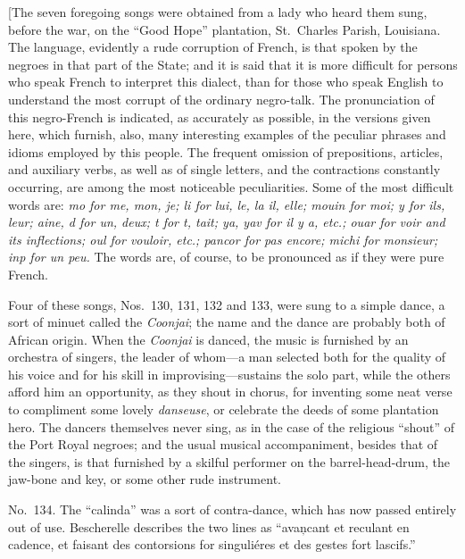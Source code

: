 \documentclass[a5paper,10pt]{book}
\begin{document}
\begin{extra}
  [The seven foregoing songs were obtained from a lady who heard them
    sung, before the war, on the ``Good Hope'' plantation, St.~Charles
    Parish, Louisiana.  The language, evidently a rude corruption of
    French, is that spoken by the negroes in that part of the State;
    and it is said that it is more difficult for persons who speak
    French to interpret this dialect, than for those who speak English
    to understand the most corrupt of the ordinary negro-talk.  The
    pronunciation of this negro-French is indicated, as accurately as
    possible, in the versions given here, which furnish, also, many
    interesting examples of the peculiar phrases and idioms employed
    by this people.  The frequent omission of prepositions, articles,
    and auxiliary verbs, as well as of single letters, and the
    contractions constantly occurring, are among the most noticeable
    peculiarities.  Some of the most difficult words are: \emph{mo
      \emph{for} me, mon, je; li \emph{for} lui, le, la il, elle;
      mouin \emph{for} moi; y \emph{for} ils, leur; aine, d \emph{for}
      un, deux; t \emph{for} t, tait; ya, yav \emph{for} il y a,
      \emph{etc.;} ouar \emph{for} voir \emph{and its inflections;}
      oul \emph{for} vouloir, \emph{etc.;} pancor \emph{for} pas
      encore; michi \emph{for} monsieur; inp \emph{for} un peu.}  The
    words are, of course, to be pronounced as if they were pure
    French.

    Four of these songs, Nos.~130, 131, 132 and 133, were sung to a
    simple dance, a sort of minuet called the \emph{Coonjai}; the name
    and the dance are probably both of African origin.  When the
    \emph{Coonjai} is danced, the music is furnished by an orchestra
    of singers, the leader of whom---a man selected both for the
    quality of his voice and for his skill in improvising---sustains
    the solo part, while the others afford him an opportunity, as they
    shout in chorus, for inventing some neat verse to compliment some
    lovely \emph{danseuse}, or celebrate the deeds of some plantation
    hero.  The dancers themselves never sing, as in the case of the
    religious ``shout'' of the Port Royal negroes; and the usual
    musical accompaniment, besides that of the singers, is that
    furnished by a skilful performer on the barrel-head-drum, the
    jaw-bone and key, or some other rude instrument.

    No.~134.  The ``calinda'' was a sort of contra-dance, which has
    now passed entirely out of use.  Bescherelle describes the two
    lines as ``avan\c{}cant et reculant en cadence, et faisant des
    contorsions for singuli\'eres et des gestes fort lascifs.''


\end{extra}
\end{document}
